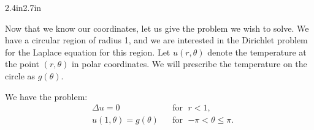 \begin{mywrapfigsimp}{2.4in}{2.7in}
\noindent
{}
\end{mywrapfigsimp}
Now that we know our coordinates, let us give the problem we wish
to solve.  We have a circular region of radius 1, and we are interested
in the Dirichlet problem for the Laplace equation for this region.  Let
$u(r,\theta)$ denote the temperature at the point $(r,\theta)$ in polar
coordinates.
We will prescribe the temperature on the circle as $g(\theta)$.

We have the problem:
\begin{equation} \label{dirichdisc:theprobeq}
\begin{aligned}
& \Delta u = 0  & & \text{for } \; r < 1, \\
& u(1,\theta) = g(\theta) & & \text{for } \; {-\pi} < \theta \leq \pi.
\end{aligned}
\end{equation}

